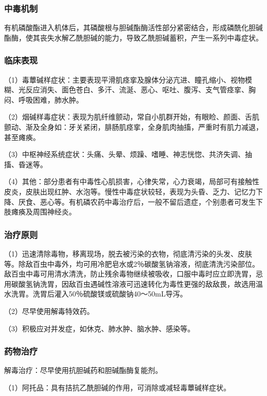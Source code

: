 \subsubsection{中毒机制}

有机磷酸酯进入机体后，其磷酸根与胆碱酯酶活性部分紧密结合，形成磷酰化胆碱酯酶，使其丧失水解乙酰胆碱的能力，导致乙酰胆碱蓄积，产生一系列中毒症状。

\subsubsection{临床表现}

（1）毒蕈碱样症状：主要表现平滑肌痉挛及腺体分泌亢进、瞳孔缩小、视物模糊、光反应消失、面色苍白、多汗、流涎、恶心、呕吐、腹泻、支气管痉挛、胸闷、呼吸困难，肺水肿。

（2）烟碱样毒症状：表现为肌纤维颤动，常自小肌群开始，有眼睑、颜面、舌肌颤动、渐及全身如：牙关紧闭，腓肠肌痉挛，全身肌肉抽搐，严重时有肌力减退，甚至瘫痪。

（3）中枢神经系统症状：头痛、头晕、烦躁、嗜睡、神志恍惚、共济失调、抽搐、昏迷等。

（4）其他：部分患者有中毒性心肌损害，心律失常，心力衰竭，局部可有接触性皮炎，皮肤出现红肿、水泡等。慢性中毒症状较轻，表现为头昏、乏力、记忆力下降、厌食、恶心等。有机磷农药中毒治疗后，一般不留后遗症，个别患者可发生下肢瘫痪及周围神经炎。

\subsubsection{治疗原则}

（1）迅速清除毒物，移离现场，脱去被污染的衣物，彻底清污染的头发、皮肤等。除敌百虫中毒外，均可用冷肥皂水或2％碳酸氢钠溶液，彻底清洗污染部位。敌百虫中毒可用清水清洗，防止残余毒物继续被吸收，口服中毒时应立即洗胃，忌用碳酸氢钠洗胃，因敌百虫遇碱性溶液可迅速转化为毒性更强的敌敌畏，故选用温水洗胃。洗胃后灌入50％硫酸镁或硫酸钠40～50mL导泻。

（2）尽早使用解毒特效药。

（3）积极应对并发症，如休克、肺水肿、脑水肿、感染等。

\subsubsection{药物治疗}

解毒治疗：尽早使用抗胆碱药和胆碱酯酶复能剂。

（1）阿托品：具有拮抗乙酰胆碱的作用，可消除或减轻毒蕈碱样症状。


